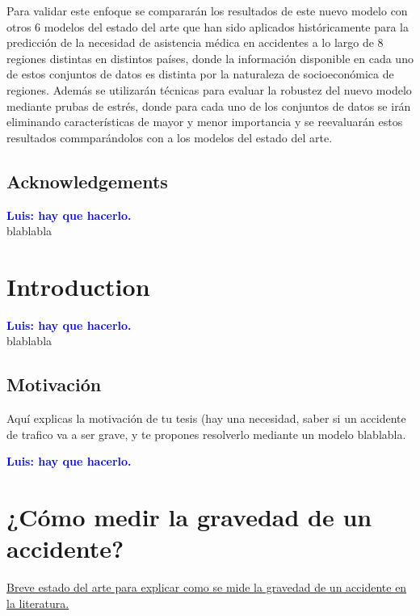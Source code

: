 \documentclass{uathesis-es}
\begin{document}
Para validar este enfoque se compararán los resultados de este nuevo modelo con otros 6 modelos del estado del arte que han sido aplicados históricamente para la predicción de la necesidad de asistencia médica en accidentes a lo largo de 8 regiones distintas en distintos países, donde la información disponible en cada uno de estos conjuntos de datos es distinta por la naturaleza de socioeconómica de regiones. Además se utilizarán técnicas para evaluar la robustez del nuevo modelo mediante prubas de estrés, donde para cada uno de los conjuntos de datos se irán eliminando características de mayor y menor importancia y se reevaluarán estos resultados commparándolos con a los modelos del estado del arte.

\section{Acknowledgements}

\textcolor{blue}{\textbf{Luis: hay que hacerlo.}}\\

blablabla

\chapter{Introduction}

\textcolor{blue}{\textbf{Luis: hay que hacerlo.}}\\


blablabla

\section{Motivación}
Aquí explicas la motivación de tu tesis (hay una necesidad, saber si un accidente de trafico va a ser grave, y te propones resolverlo mediante un modelo blablabla.

\textcolor{blue}{\textbf{Luis: hay que hacerlo.}}\\



\chapter{¿Cómo medir la gravedad de un accidente?}

\underline{Breve estado del arte para explicar como se mide la gravedad de un accidente en la literatura.}
\end{document}
